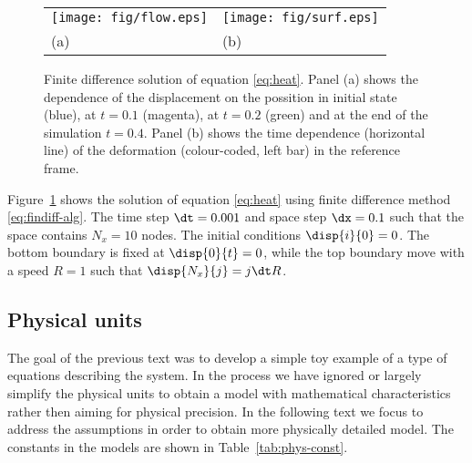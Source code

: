 \documentclass[twoside,a4paper,12pt]{article}
\newcommand{\figref}[1]{Figure~\ref{#1}}
\newcommand{\tabref}[1]{Table~\ref{#1}}
\begin{document}
\begin{figure}
  \centering
  \begin{tabular}{l@{}l}
    \texttt{[image: fig/flow.eps]}&
                                                     \texttt{[image: fig/surf.eps]}\\
    (a)&(b)
  \end{tabular}
  \caption{Finite difference solution of equation
    \eqref{eq:heat}. Panel (a) shows the dependence of the
    displacement on the possition in initial state (blue), at $t=0.1$
    (magenta), at $t=0.2$ (green) and at the end of the simulation
    $t=0.4$.  Panel (b) shows the time dependence (horizontal line) of
    the deformation (colour-coded, left bar) in the reference frame.}
  \label{fig:findiff-heat}
\end{figure}

\figref{fig:findiff-heat} shows the solution of equation
\eqref{eq:heat} using finite difference method
\eqref{eq:findiff-alg}. The time step $\dt=0.001$ and space step
$\dx = 0.1$ such that the space contains $N_x=10$ nodes. The initial
conditions $\disp{i}{0} = 0$. The bottom boundary is fixed at
$\disp{0}{t} = 0$, while the top boundary move with a speed $R=1$ such
that $\disp{N_x}{j} = j \dt R$.



\subsection{Physical units}

The goal of the previous text was to develop a simple toy example of a
type of equations describing the system. In the process we have ignored
or largely simplify the physical units to obtain a model with
mathematical characteristics rather then aiming for physical
precision. In the following text we focus to address the assumptions
in order to obtain more physically detailed model. The constants in the
models are shown in \tabref{tab:phys-const}.
\end{document}
